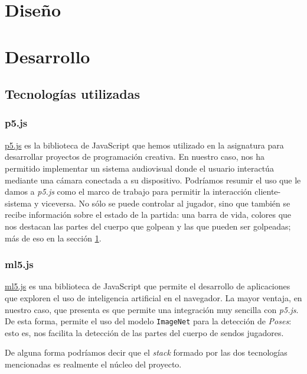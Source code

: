 \documentclass{article}
\begin{document}
\section{Diseño}
\label{section:design}



\section{Desarrollo}
\label{section:development}

\subsection{Tecnologías utilizadas}

\subsubsection{p5.js}

\href{https://p5js.org/es/}{p5.js} es la biblioteca de JavaScript que hemos utilizado en la asignatura para desarrollar proyectos de programación creativa. En nuestro caso, nos ha permitido implementar un sistema audiovisual donde el usuario interactúa mediante una cámara conectada a su dispositivo. Podríamos resumir el uso que le damos a \textit{p5.js} como el marco de trabajo para permitir la interacción cliente-sistema y viceversa. No sólo se puede controlar al jugador, sino que también se recibe información sobre el estado de la partida: una barra de vida, colores que nos destacan las partes del cuerpo que golpean y las que pueden ser golpeadas; más de eso en la sección \ref{section:design}.

\subsubsection{ml5.js}

\href{https://ml5js.org/}{ml5.js} es una biblioteca de JavaScript que permite el desarrollo de aplicaciones que exploren el uso de inteligencia artificial en el navegador. La mayor ventaja, en nuestro caso, que presenta es que permite una integración muy sencilla con \textit{p5.js}. De esta forma, permite el uso del modelo \texttt{ImageNet} para la detección de \textit{Poses}: esto es, nos facilita la detección de las partes del cuerpo de sendos jugadores.

De alguna forma podríamos decir que el \textit{stack} formado por las dos tecnologías mencionadas es realmente el núcleo del proyecto.
\end{document}
